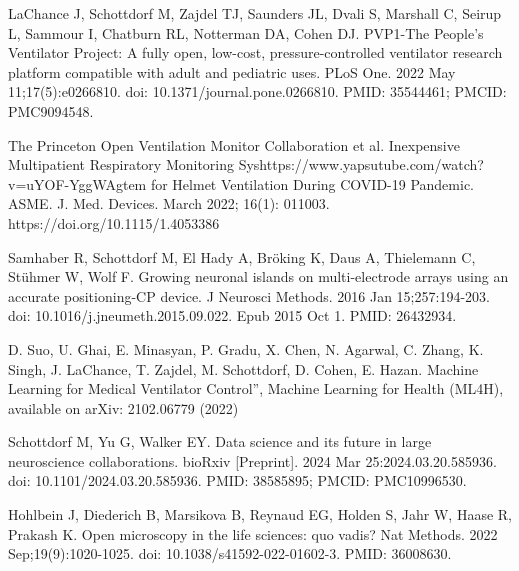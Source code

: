 \documentclass[10pt,letterpaper]{article}
\begin{document}
\begin{thebibliography}{10}
LaChance J, Schottdorf M, Zajdel TJ, Saunders JL, Dvali S, Marshall C, Seirup L, Sammour I, Chatburn RL, Notterman DA, Cohen DJ. PVP1-The People's Ventilator Project: A fully open, low-cost, pressure-controlled ventilator research platform compatible with adult and pediatric uses. PLoS One. 2022 May 11;17(5):e0266810. doi: 10.1371/journal.pone.0266810. PMID: 35544461; PMCID: PMC9094548.

The Princeton Open Ventilation Monitor Collaboration et al. Inexpensive Multipatient Respiratory Monitoring Syshttps://www.yapsutube.com/watch?v=uYOF-YggWAgtem for Helmet Ventilation During COVID-19 Pandemic. ASME. J. Med. Devices. March 2022; 16(1): 011003. https://doi.org/10.1115/1.4053386

Samhaber R, Schottdorf M, El Hady A, Bröking K, Daus A, Thielemann C, Stühmer W, Wolf F. Growing neuronal islands on multi-electrode arrays using an accurate positioning-\textmu CP device. J Neurosci Methods. 2016 Jan 15;257:194-203. doi: 10.1016/j.jneumeth.2015.09.022. Epub 2015 Oct 1. PMID: 26432934.

D. Suo, U. Ghai, E. Minasyan, P. Gradu, X. Chen, N. Agarwal, C. Zhang, K. Singh, J. LaChance, T. Zajdel, M. Schottdorf, D. Cohen, E. Hazan. Machine Learning for Medical Ventilator Control”, Machine Learning for Health (ML4H), available on arXiv: 2102.06779 (2022)

Schottdorf M, Yu G, Walker EY. Data science and its future in large neuroscience collaborations. bioRxiv [Preprint]. 2024 Mar 25:2024.03.20.585936. doi: 10.1101/2024.03.20.585936. PMID: 38585895; PMCID: PMC10996530.

Hohlbein J, Diederich B, Marsikova B, Reynaud EG, Holden S, Jahr W, Haase R, Prakash K. Open microscopy in the life sciences: quo vadis? Nat Methods. 2022 Sep;19(9):1020-1025. doi: 10.1038/s41592-022-01602-3. PMID: 36008630.

\end{thebibliography}
\end{document}
